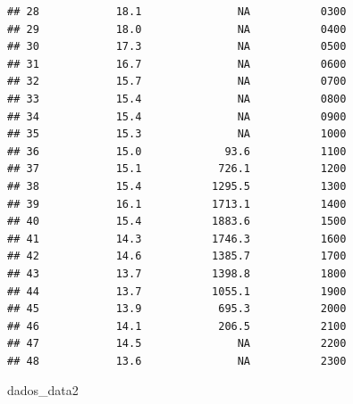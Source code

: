 \documentclass[
]{article}
\newenvironment{Shaded}{\begin{snugshade}}{\end{snugshade}}
\newcommand{\NormalTok}[1]{#1}
\begin{document}
\begin{verbatim}
## 28            18.1               NA           0300
## 29            18.0               NA           0400
## 30            17.3               NA           0500
## 31            16.7               NA           0600
## 32            15.7               NA           0700
## 33            15.4               NA           0800
## 34            15.4               NA           0900
## 35            15.3               NA           1000
## 36            15.0             93.6           1100
## 37            15.1            726.1           1200
## 38            15.4           1295.5           1300
## 39            16.1           1713.1           1400
## 40            15.4           1883.6           1500
## 41            14.3           1746.3           1600
## 42            14.6           1385.7           1700
## 43            13.7           1398.8           1800
## 44            13.7           1055.1           1900
## 45            13.9            695.3           2000
## 46            14.1            206.5           2100
## 47            14.5               NA           2200
## 48            13.6               NA           2300
\end{verbatim}

\begin{Shaded}
\begin{Highlighting}[]
\NormalTok{dados\_data2}
\end{Highlighting}
\end{Shaded}
\end{document}

